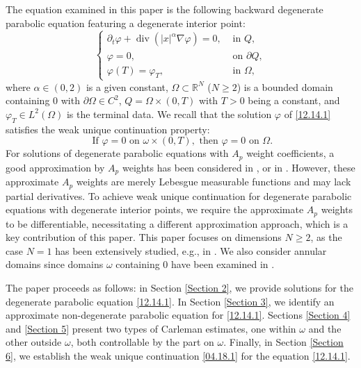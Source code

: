 \documentclass[11pt]{article}
\numberwithin{equation}{section}
\DeclareMathOperator{\Div}{div}
\begin{document}
The equation examined in this paper is the following backward degenerate parabolic equation featuring a degenerate interior point:
\begin{equation}\label{12.14.1}
\begin{cases}
\partial_t \varphi + \Div(|x|^\alpha \nabla \varphi) = 0, & \text{ in } Q, \\
\varphi = 0, & \text{ on } \partial Q, \\
\varphi(T) = \varphi_T, & \text{ in } \Omega,
\end{cases}
\end{equation}
where $\alpha \in (0,2)$ is a given constant, $\Omega \subset \mathbb{R}^N$ ($N \geq 2$) is a bounded domain containing $0$ with $\partial \Omega \in C^2$, $Q = \Omega \times (0,T)$ with $T > 0$ being a constant, and $\varphi_T \in L^2(\Omega)$ is the terminal data. We recall that the solution $\varphi$ of \eqref{12.14.1} satisfies the weak unique continuation property:
\begin{equation}\label{04.18.1}
\text{ If } \varphi = 0 \text{  on } \omega \times (0,T), \text{  then } \varphi = 0 \text{  on } \Omega.
\end{equation}
For solutions of degenerate parabolic equations with $A_p$ weight coefficients, a good approximation by $A_p$ weights has been considered in \cite[lemma 2,section 2]{FF}, or in \cite{CS2,CS3}. However, these approximate $A_p$ weights are merely Lebesgue measurable functions and may lack partial derivatives. To achieve weak unique continuation for degenerate parabolic equations with degenerate interior points, we require the approximate $A_p$ weights to be differentiable, necessitating a different approximation approach, which is a key contribution of this paper.
This paper focuses on dimensions $N \geq 2$, as the case $N = 1$ has been extensively studied, e.g., in \cite{Alabau}. We also consider annular domains since domains $\omega$ containing $0$ have been examined in \cite{Wu}.

The paper proceeds as follows: in Section \ref{Section 2}, we provide solutions for the degenerate parabolic equation \eqref{12.14.1}. In Section \ref{Section 3}, we identify an approximate non-degenerate parabolic equation for \eqref{12.14.1}. Sections \ref{Section 4} and \ref{Section 5} present two types of Carleman estimates, one within $\omega$ and the other outside $\omega$, both controllable by the part on $\omega$. Finally, in Section \ref{Section 6}, we establish the weak unique continuation \eqref{04.18.1} for the equation \eqref{12.14.1}.
	
\end{document}
